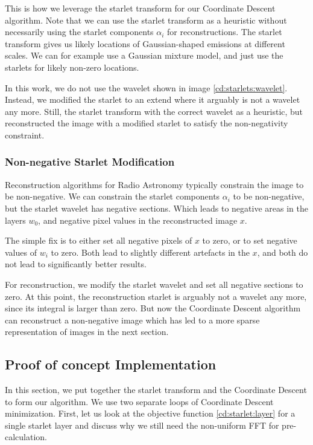 This is how we  leverage the starlet transform for our Coordinate Descent algorithm. Note that we can use the starlet transform as a heuristic without necessarily using the starlet components $\alpha_i$ for reconstructions. The starlet transform gives us likely locations of Gaussian-shaped emissions at different scales. We can for example use a Gaussian mixture model, and just use the starlets for likely non-zero locations. 

In this work, we do not use the wavelet shown in image \ref{cd:starlets:wavelet}. Instead, we modified the starlet to an extend where it arguably is not a wavelet any more. Still, the starlet transform with the correct wavelet as a heuristic, but reconstructed the image with a modified starlet to satisfy the non-negativity constraint. 


\subsubsection{Non-negative Starlet Modification}\label{cd:starlets:modification}
Reconstruction algorithms for Radio Astronomy typically constrain the image to be non-negative\cite{mcewen2011compressed}. We can constrain the starlet components $\alpha_i$ to be non-negative, but the starlet wavelet has negative sections. Which leads to negative areas in the layers $w_0$, and negative pixel values in the reconstructed image $x$.

The simple fix is to either set all negative pixels of $x$ to zero, or to set negative values of $w_i$ to zero. Both lead to slightly different artefacts in the $x$, and both do not lead to significantly better results.

For reconstruction, we modify the starlet wavelet and set all negative sections to zero. At this point, the reconstruction starlet is arguably not a wavelet any more, since its integral is larger than zero. But now the Coordinate Descent algorithm can reconstruct a non-negative image which has led to a more sparse representation of images in the next section.



\subsection{Proof of concept Implementation}
In this section, we put together the starlet transform and the Coordinate Descent to form our algorithm. We use two separate loops of Coordinate Descent minimization. First, let us look at the objective function \eqref{cd:starlet:layer} for a single starlet layer and discuss why we still need the non-uniform FFT for pre-calculation. 

